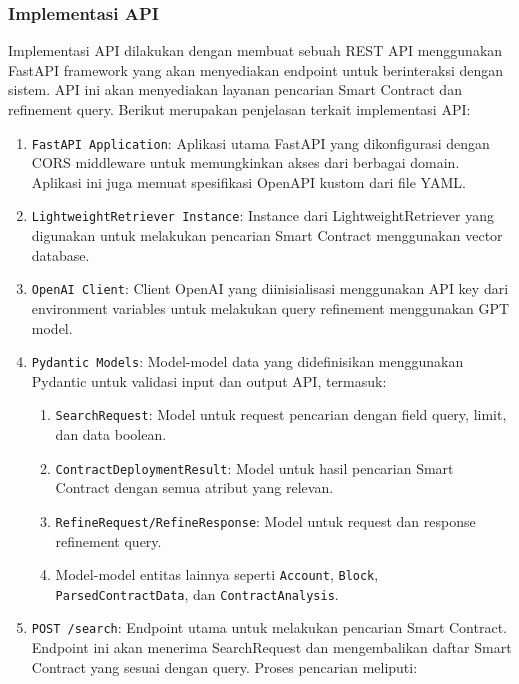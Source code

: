 \subsubsection{Implementasi API}

Implementasi API dilakukan dengan membuat sebuah REST API menggunakan FastAPI framework yang akan menyediakan endpoint untuk berinteraksi dengan sistem. API ini akan menyediakan layanan pencarian Smart Contract dan refinement query. Berikut merupakan penjelasan terkait implementasi API:

\begin{enumerate}
    \item \texttt{FastAPI Application}: Aplikasi utama FastAPI yang dikonfigurasi dengan CORS middleware untuk memungkinkan akses dari berbagai domain. Aplikasi ini juga memuat spesifikasi OpenAPI kustom dari file YAML.
    \item \texttt{LightweightRetriever Instance}: Instance dari LightweightRetriever yang digunakan untuk melakukan pencarian Smart Contract menggunakan vector database.
    \item \texttt{OpenAI Client}: Client OpenAI yang diinisialisasi menggunakan API key dari environment variables untuk melakukan query refinement menggunakan GPT model.
    \item \texttt{Pydantic Models}: Model-model data yang didefinisikan menggunakan Pydantic untuk validasi input dan output API, termasuk:
    \begin{enumerate}
        \item \texttt{SearchRequest}: Model untuk request pencarian dengan field query, limit, dan data boolean.
        \item \texttt{ContractDeploymentResult}: Model untuk hasil pencarian Smart Contract dengan semua atribut yang relevan.
        \item \texttt{RefineRequest/RefineResponse}: Model untuk request dan response refinement query.
        \item Model-model entitas lainnya seperti \texttt{Account}, \texttt{Block}, \\\texttt{ParsedContractData}, dan \texttt{ContractAnalysis}.
    \end{enumerate}
    \item \texttt{POST /search}: Endpoint utama untuk melakukan pencarian Smart Contract. Endpoint ini akan menerima SearchRequest dan mengembalikan daftar Smart Contract yang sesuai dengan query. Proses pencarian meliputi:
    \begin{enumerate}

\end{enumerate}
\end{enumerate}
